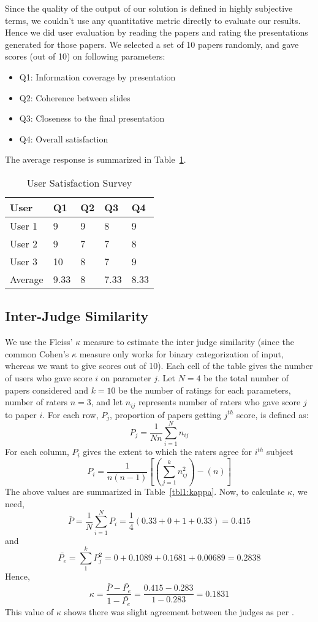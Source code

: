 Since the quality of the output of our solution is defined
in highly subjective terms, we couldn't use any quantitative metric
directly to evaluate our results. Hence we did user evaluation by reading
the papers and rating the presentations generated for those papers.
We selected a set of 10 papers randomly, and gave scores (out of 10) on following 
parameters:
\begin{itemize}
	\item Q1: Information coverage by presentation
	\item Q2: Coherence between slides
	\item Q3: Closeness to the final presentation
	\item Q4: Overall satisfaction
\end{itemize}
The average response is summarized in Table~\ref{tbl1:users}.

\begin{table}
\begin{center}
\caption{User Satisfaction Survey}
\begin{tabular}{| l | l | l | l | l |}
\hline
User & Q1 & Q2 & Q3 & Q4 \\ \hline
User 1 & 9 & 9 & 8 & 9 \\ 
User 2 & 9 & 7 & 7 & 8 \\ 
User 3 & 10 & 8 & 7 & 9 \\ \hline
Average & 9.33 & 8 & 7.33 & 8.33 \\ \hline
\end{tabular}
\label{tbl1:users}
\end{center}
\end{table}	


\subsection{Inter-Judge Similarity}
We use the Fleiss' $\kappa$ measure \cite{kappa} to estimate the inter judge similarity
(since the common Cohen's $\kappa$ measure only works for binary categorization
of input, whereas we want to give scores out of 10).
Each cell of the table gives the number of users who gave score $i$ on 
parameter $j$. Let $N = 4$ be the total number of papers considered
and $k = 10$ be the number of ratings for each parameters, number of raters $n = 3$, 
and let $n_{ij}$
represents number of raters who gave score $j$ to paper $i$.
For each row, $P_j$, proportion of papers getting $j^{th}$ score, is defined as:
\[
	P_j = \frac{1}{Nn} \sum_{i=1}^{N} n_{ij}
\]
For each column, $P_i$ gives the extent to which the raters agree for $i^{th}$ subject
\[
	P_i = \frac{1}{n(n-1)} \left[ \left( \sum_{j=1}^{k} n_{ij}^{2} \right) - \left( n \right) \right]
\]
The above values are summarized in Table~\ref{tbl1:kappa}.
Now, to calculate $\kappa$, we need,
\[
	\bar{P} = \frac{1}{N} \sum_{i=1}^{N} P_i = \frac{1}{4} \left( 0.33 + 0 + 1 + 0.33 \right) = 0.415
\]
and
\[
	\bar{P_e} = \sum_{1}^{k} P_j^2 = 0 + 0.1089 + 0.1681 + 0.00689 = 0.2838
\]
Hence, 
\[
	\kappa = \frac {\bar{P} - \bar{P_e}} {1 - \bar{P_e}} = \frac{0.415 - 0.283}{1 - 0.283} = 0.1831
\]
This value of $\kappa$ shows there was slight agreement between the judges as per \cite{kappa}.

